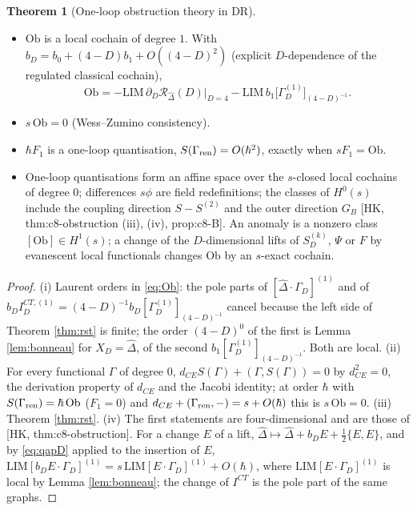 \documentclass[11pt]{article}
\theoremstyle{definition}
\newtheorem{theorem}[definition]{Theorem}
\numberwithin{equation}{section}
\begin{document}
\begin{theorem}[One-loop obstruction theory in DR]
\label{thm:obs}
\mbox{}\begin{itemize}
\item[(i)] $\mathrm{Ob}$ is a local cochain of degree $1$. With $b_D=b_0+(4-D)b_1+O((4-D)^2)$ (explicit $D$-dependence of the regulated classical cochain),
\[
\mathrm{Ob}=-\mathrm{LIM}\,\partial_D\mathcal R_{\widehat\Delta}(D)\big|_{D=4}-\mathrm{LIM}\,b_1\big[\Gamma^{(1)}_D\big]_{(4-D)^{-1}}.
\]
\item[(ii)] $s\,\mathrm{Ob}=0$ (Wess--Zumino consistency).
\item[(iii)] $\hbar F_1$ is a one-loop quantisation, $S(\Gamma_{\rm ren})=O(\hbar^2)$, exactly when $sF_1=\mathrm{Ob}$.
\item[(iv)] One-loop quantisations form an affine space over the $s$-closed local cochains of degree $0$; differences $s\phi$ are field redefinitions; the classes of $H^0(s)$ include the coupling direction $S-S^{(2)}$ and the outer direction $G_B$ [HK, thm:c8-obstruction (iii), (iv), prop:c8-B]. An anomaly is a nonzero class $[\mathrm{Ob}]\in H^1(s)$; a change of the $D$-dimensional lifts of $S^{(k)}_D$, $\Psi$ or $F$ by evanescent local functionals changes $\mathrm{Ob}$ by an $s$-exact cochain.
\end{itemize}
\end{theorem}

\begin{proof}
(i) Laurent orders in \eqref{eq:Ob}: the pole parts of $[\widehat\Delta\cdot\Gamma_D]^{(1)}$ and of $b_DI^{CT,(1)}_D=(4-D)^{-1}b_D[\Gamma^{(1)}_D]_{(4-D)^{-1}}$ cancel because the left side of Theorem \ref{thm:rst} is finite; the order $(4-D)^0$ of the first is Lemma \ref{lem:bonneau} for $X_D=\widehat\Delta$, of the second $b_1[\Gamma^{(1)}_D]_{(4-D)^{-1}}$. Both are local. (ii) For every functional $\Gamma$ of degree $0$, $d_{CE}S(\Gamma)+(\Gamma,S(\Gamma))=0$ by $d_{CE}^2=0$, the derivation property of $d_{CE}$ and the Jacobi identity; at order $\hbar$ with $S(\Gamma_{\rm ren})=\hbar\,\mathrm{Ob}$ ($F_1=0$) and $d_{CE}+(\Gamma_{\rm ren},-)=s+O(\hbar)$ this is $s\,\mathrm{Ob}=0$. (iii) Theorem \ref{thm:rst}. (iv) The first statements are four-dimensional and are those of [HK, thm:c8-obstruction]. For a change $E$ of a lift, $\widehat\Delta\mapsto\widehat\Delta+b_DE+\frac12\{E,E\}$, and by \eqref{eq:qapD} applied to the insertion of $E$, $\mathrm{LIM}[b_DE\cdot\Gamma_D]^{(1)}=s\,\mathrm{LIM}[E\cdot\Gamma_D]^{(1)}+O(\hbar)$, where $\mathrm{LIM}[E\cdot\Gamma_D]^{(1)}$ is local by Lemma \ref{lem:bonneau}; the change of $I^{CT}$ is the pole part of the same graphs.
\end{proof}
\end{document}
